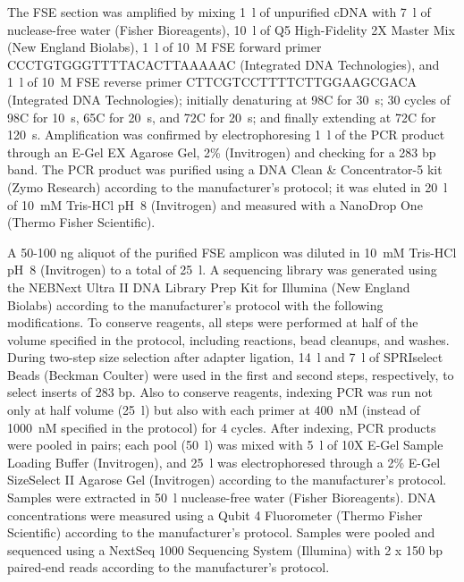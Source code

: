 \documentclass[main.tex]{subfiles}
\begin{document}
The FSE section was amplified by mixing 1~\textmu l of unpurified cDNA with 7~\textmu l of nuclease-free water (Fisher Bioreagents), 10~\textmu l of Q5 High-Fidelity 2X Master Mix (New England Biolabs), 1~\textmu l of 10~\textmu M FSE forward primer CCCTGTGGGTTTTACACTTAAAAAC (Integrated DNA Technologies), and 1~\textmu l of 10~\textmu M FSE reverse primer CTTCGTCCTTTTCTTGGAAGCGACA (Integrated DNA Technologies); initially denaturing at 98\textdegree C for 30~s; 30 cycles of 98\textdegree C for 10~s, 65\textdegree C for 20~s, and 72\textdegree C for 20~s; and finally extending at 72\textdegree C for 120~s.
Amplification was confirmed by electrophoresing 1~\textmu l of the PCR product through an E-Gel EX Agarose Gel, 2\% (Invitrogen) and checking for a 283 bp band.
The PCR product was purified using a DNA Clean \& Concentrator-5 kit (Zymo Research) according to the manufacturer's protocol; it was eluted in 20~\textmu l of 10~mM Tris-HCl pH~8 (Invitrogen) and measured with a NanoDrop One (Thermo Fisher Scientific).

A 50-100 ng aliquot of the purified FSE amplicon was diluted in 10~mM Tris-HCl pH~8 (Invitrogen) to a total of 25~\textmu l.
A sequencing library was generated using the NEBNext Ultra II DNA Library Prep Kit for Illumina (New England Biolabs) according to the manufacturer's protocol with the following modifications.
To conserve reagents, all steps were performed at half of the volume specified in the protocol, including reactions, bead cleanups, and washes.
During two-step size selection after adapter ligation, 14~\textmu l and 7~\textmu l of SPRIselect Beads (Beckman Coulter) were used in the first and second steps, respectively, to select inserts of 283 bp.
Also to conserve reagents, indexing PCR was run not only at half volume (25~\textmu l) but also with each primer at 400~nM (instead of 1000~nM specified in the protocol) for 4 cycles.
After indexing, PCR products were pooled in pairs; each pool (50~\textmu l) was mixed with 5~\textmu l of 10X E-Gel Sample Loading Buffer (Invitrogen), and 25~\textmu l was electrophoresed through a 2\% E-Gel SizeSelect II Agarose Gel (Invitrogen) according to the manufacturer's protocol.
Samples were extracted in 50~\textmu l nuclease-free water (Fisher Bioreagents).
DNA concentrations were measured using a Qubit 4 Fluorometer (Thermo Fisher Scientific) according to the manufacturer's protocol.
Samples were pooled and sequenced using a NextSeq 1000 Sequencing System (Illumina) with 2 x 150 bp paired-end reads according to the manufacturer's protocol.
\end{document}
